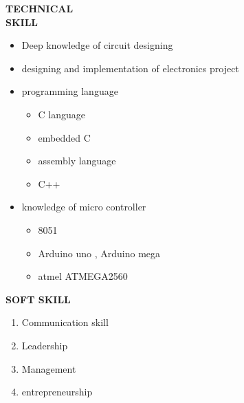 \documentclass{article}
\begin{document}
   \begin{flushleft}
   	\vspace{0.4in}
   	\textbf{TECHNICAL  \\ SKILL}
   	\begin{itemize}
   		\vspace{-0.45in}
   		\addtolength{\itemindent}{1.359in}
   		\item  Deep knowledge of circuit designing
   		\item  designing and implementation of electronics project
   		\item  programming language
   		{\begin{itemize}
   				\addtolength{\itemindent}{1.359in}
   				\item C language
   				\item embedded C
   				\item assembly language
   				\item C++
   				
   			\end{itemize}
   		}  
   		\item knowledge of micro controller
   		{\begin{itemize}
   				\addtolength{\itemindent}{1.359in}
   				\item 8051 
   				\item Arduino uno , Arduino mega
   				\item atmel ATMEGA2560
   				
   			\end{itemize}
   		}  
   		
   	\end{itemize}
   \end{flushleft}
   
   	\begin{flushleft} 
   		
   		\vspace{0.4in}
   		\textbf{SOFT SKILL}
   		\begin{enumerate}
   			\vspace{-0.30in}
   			\addtolength{\itemindent}{1.359in}
   			\item Communication skill
   			\item Leadership 
   			\item Management 
   			\item entrepreneurship
   		\end{enumerate}
   	\end{flushleft}
 
\end{document}
